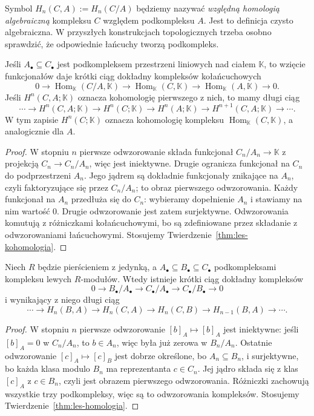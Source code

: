 Symbol $H_n(C,A):=H_n(C/A)$ będziemy
nazywać \emph{względną homologią
algebraiczną} kompleksu $C$ względem
podkompleksu $A$. Jest to definicja
czysto algebraiczna. W przyszłych
konstrukcjach topologicznych trzeba
osobno sprawdzić, że odpowiednie
łańcuchy tworzą podkompleks.

\begin{stwierdzenie}
\label{prop:wzgledna-kohomologia}
Jeśli $A_\bullet\subseteq C_\bullet$
jest podkompleksem przestrzeni liniowych
nad ciałem $\mathbb K$, to wzięcie
funkcjonałów daje krótki ciąg dokładny
kompleksów kołańcuchowych
\[
 0\to\operatorname{Hom}_{\mathbb K}
      (C/A,\mathbb K)
 \to\operatorname{Hom}_{\mathbb K}(C,\mathbb K)
 \to\operatorname{Hom}_{\mathbb K}(A,\mathbb K)
 \to0.
\]
Jeśli $H^n(C,A;\mathbb K)$ oznacza
kohomologię pierwszego z nich, to mamy
długi ciąg
\[
 \cdots\to H^n(C,A;\mathbb K)\to H^n(C;\mathbb K)
 \to H^n(A;\mathbb K)\to H^{n+1}(C,A;\mathbb K)
 \to\cdots .
\]
W tym zapisie $H^n(C;\mathbb K)$
oznacza kohomologię kompleksu
$\operatorname{Hom}_{\mathbb K}(C,\mathbb K)$,
a analogicznie dla $A$.
\end{stwierdzenie}
\begin{proof}
W stopniu $n$ pierwsze odwzorowanie składa
funkcjonał $C_n/A_n\to\mathbb K$
z projekcją $C_n\to C_n/A_n$,
więc jest iniektywne.
Drugie ogranicza funkcjonał na $C_n$
do podprzestrzeni $A_n$.
Jego jądrem są dokładnie funkcjonały
znikające na $A_n$, czyli faktoryzujące
się przez $C_n/A_n$; to obraz
pierwszego odwzorowania. Każdy funkcjonał
na $A_n$ przedłuża się do $C_n$:
wybieramy dopełnienie $A_n$
i stawiamy na nim wartość $0$.
Drugie odwzorowanie jest zatem surjektywne.
Odwzorowania komutują z różniczkami
kołańcuchowymi, bo są zdefiniowane
przez składanie z odwzorowaniami łańcuchowymi.
Stosujemy
Twierdzenie~\ref{thm:les-kohomologia}.
\end{proof}

\begin{stwierdzenie}
\label{prop:les-potrojny}
Niech $R$ będzie pierścieniem z jedynką,
a $A_\bullet\subseteq B_\bullet\subseteq C_\bullet$
podkompleksami kompleksu lewych $R$-modułów.
Wtedy istnieje
krótki ciąg dokładny kompleksów
\[
 0\longrightarrow B_\bullet/A_\bullet
 \longrightarrow C_\bullet/A_\bullet
 \longrightarrow C_\bullet/B_\bullet
 \longrightarrow0
\]
i wynikający z niego długi ciąg
\[
 \cdots\to H_n(B,A)\to H_n(C,A)\to H_n(C,B)
 \to H_{n-1}(B,A)\to\cdots.
\]
\end{stwierdzenie}
\begin{proof}
W stopniu $n$ pierwsze odwzorowanie
$[b]_A\mapsto[b]_A$ jest iniektywne:
jeśli $[b]_A=0$ w $C_n/A_n$, to
$b\in A_n$, więc była już zerowa w
$B_n/A_n$. Ostatnie odwzorowanie
$[c]_A\mapsto[c]_B$ jest dobrze
określone, bo $A_n\subseteq B_n$,
i surjektywne, bo każda klasa modulo
$B_n$ ma reprezentanta $c\in C_n$.
Jej jądro składa się z klas
$[c]_A$ z $c\in B_n$, czyli jest
obrazem pierwszego odwzorowania.
Różniczki zachowują wszystkie trzy
podkompleksy, więc są to odwzorowania
kompleksów. Stosujemy
Twierdzenie~\ref{thm:les-homologia}.
\end{proof}

